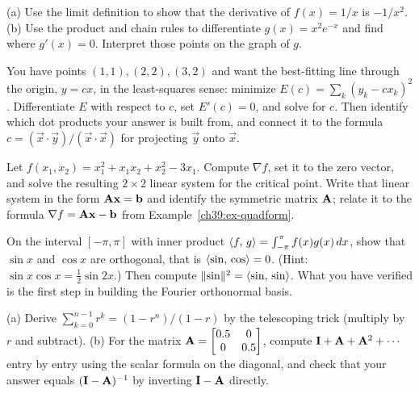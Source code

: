 \begin{exercise}
\label{ch39:ex7}
(a) Use the limit definition to show that the derivative of $f(x) = 1/x$ is $-1/x^2$.
(b) Use the product and chain rules to differentiate $g(x) = x^2 e^{-x}$ and find where $g'(x)=0$.
Interpret those points on the graph of $g$.
\end{exercise}

\begin{exercise}
\label{ch39:ex8}
You have points $(1,1), (2,2), (3,2)$ and want the best-fitting line through the origin, $y = cx$, in
the least-squares sense: minimize $E(c) = \sum_{k}(y_k - c x_k)^2$. Differentiate $E$ with respect to
$c$, set $E'(c) = 0$, and solve for $c$. Then identify which dot products your answer is built from,
and connect it to the formula $c = (\vec{x}\cdot\vec{y})/(\vec{x}\cdot\vec{x})$ for projecting
$\vec{y}$ onto $\vec{x}$.
\end{exercise}

\begin{exercise}
\label{ch39:ex9}
Let $f(x_1,x_2) = x_1^2 + x_1 x_2 + x_2^2 - 3x_1$. Compute $\nabla f$, set it to the zero vector, and
solve the resulting $2\times 2$ linear system for the critical point. Write that linear system in the
form $\mathbf{A}\mathbf{x} = \mathbf{b}$ and identify the symmetric matrix $\mathbf{A}$; relate it to the
formula $\nabla f = \mathbf{A}\mathbf{x} - \mathbf{b}$ from Example~\ref{ch39:ex-quadform}.
\end{exercise}

\begin{exercise}
\label{ch39:ex10}
On the interval $[-\pi, \pi]$ with inner product $\langle f,\, g \rangle = \int_{-\pi}^{\pi} f(x)g(x)\,dx$, show that
$\sin x$ and $\cos x$ are orthogonal, that is $\langle \sin,\, \cos \rangle = 0$. (Hint: $\sin x\cos x =
\tfrac12\sin 2x$.) Then compute $\lVert\sin\rVert^2 = \langle \sin,\, \sin \rangle$. What you have verified is
the first step in building the Fourier orthonormal basis.
\end{exercise}

\begin{exercise}
\label{ch39:ex11}
(a) Derive $\sum_{k=0}^{n-1} r^k = (1-r^n)/(1-r)$ by the telescoping trick (multiply by $r$ and
subtract). (b) For the matrix $\mathbf{A} = \begin{bmatrix} 0.5 & 0 \\ 0 & 0.5\end{bmatrix}$, compute
$\mathbf{I} + \mathbf{A} + \mathbf{A}^2 + \cdots$ entry by entry using the scalar formula on the diagonal, and
check that your answer equals $(\mathbf{I} - \mathbf{A})^{-1}$ by inverting $\mathbf{I}-\mathbf{A}$ directly.
\end{exercise}

